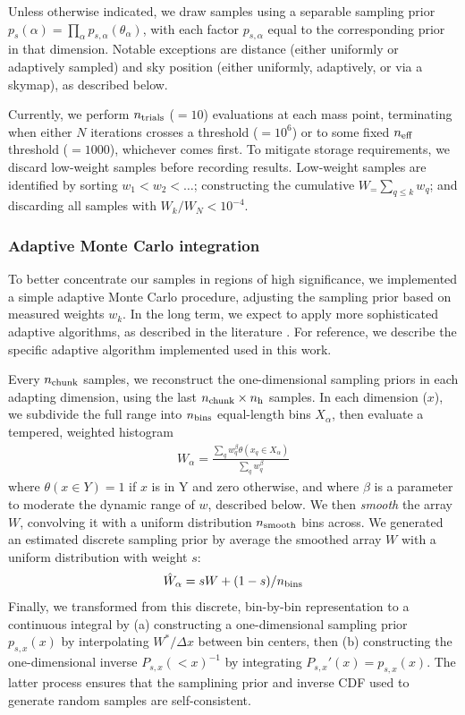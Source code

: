 %
Unless otherwise indicated, we draw samples using a separable sampling prior $p_s(\alpha) =
\prod_{\alpha}p_{s,\alpha}(\theta_\alpha)$, with each factor $p_{s,\alpha}$ equal to the corresponding prior in that dimension.  Notable exceptions are
distance (either uniformly or adaptively sampled) and sky position (either uniformly, adaptively, or via a skymap), as
described below.
%

Currently, we perform $n_{\rm trials}$ ($=10$) evaluations at each mass point, terminating when either $N$ iterations
crosses a threshold ($=10^6$) or to some fixed
$n_{\rm eff}$ threshold ($=1000$), whichever comes first.  
To mitigate storage requirements, we discard  low-weight samples before recording results.  Low-weight samples are identified by sorting  $w_1<w_2<\ldots$;
constructing the cumulative $W_=\sum_{q\le k} w_q$; and discarding all samples with $W_k/W_N<10^{-4}$.  

\subsubsection{Adaptive Monte Carlo integration}

To better concentrate our samples in regions of high significance, we implemented a simple adaptive Monte Carlo procedure, adjusting
the sampling prior based on measured weights $w_k$.   In the long term, we expect to apply more sophisticated adaptive
algorithms, as described in the literature \cite{book-mm-NumericalRecipies,peter1978new}.  For reference, we describe
the specific adaptive algorithm implemented used in this work.


Every $n_{\rm chunk}$ samples, we reconstruct the one-dimensional sampling priors in each adapting dimension, using
the last $n_{\rm chunk}\times n_{\rm h}$ samples.    In each dimension ($x$), we subdivide the full range
into $n_{\rm bins}$ equal-length bins $X_\alpha$, then evaluate a tempered, weighted histogram
\begin{eqnarray}
W_\alpha = \frac{\sum_{q} w_q^\beta \theta(x_q\in X_\alpha)}{\sum_q w_q^\beta}
\end{eqnarray}
where $\theta(x\in Y)=1$ if  $x$ is in Y and zero otherwise,  and where $\beta$ is a  parameter to moderate the dynamic
range of $w$, described below.  
%
We then \emph{smooth} the array $W$, convolving it with a uniform distribution $n_{\rm smooth}$ bins across.
%
We generated an estimated discrete sampling prior by average the smoothed array $W$ with a uniform distribution with weight $s$:
\begin{eqnarray}
\hat{W}_\alpha = s W + (1-s)/n_{\rm bins}
\end{eqnarray}
Finally, we transformed from this discrete, bin-by-bin representation to a continuous integral by (a) constructing
a one-dimensional sampling prior $p_{s,x}(x)$  by interpolating $W^*/\Delta x$ between bin centers, then (b) constructing the
one-dimensional inverse $P_{s,x}(<x)^{-1}$ by integrating $P_{s,x}'(x)=p_{s,x}(x)$.  
%
The latter process ensures that the samplining prior and inverse CDF used to generate random samples are
self-consistent.   
%


